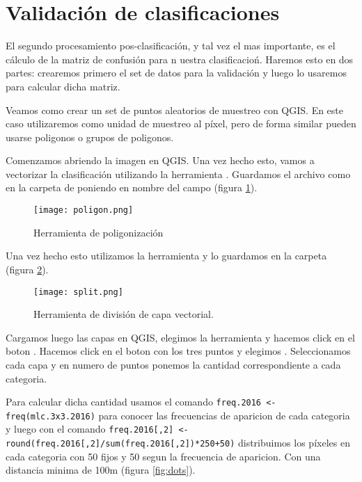 \section{Validaci\'on de clasificaciones}

El segundo procesamiento pos-clasificaci\'on, y tal vez el mas importante, es el c\'alculo de la matriz de confusi\'on para n
uestra clasificacio\'n. Haremos esto en dos partes: crearemos primero el set de datos para la validaci\'on y luego lo usaremos para calcular dicha matriz.

\begin{exa}
  Veamos como crear un set de puntos aleatorios de muestreo con QGIS. En este caso utilizaremos como unidad de muestreo al p\'ixel, pero de forma similar pueden usarse poligonos o grupos de poligonos.

  Comenzamos abriendo la imagen  en QGIS. Una vez hecho esto, vamos a vectorizar la clasificaci\'on utilizando la herramienta . Guardamos el archivo como  en la carpeta de  poniendo en nombre del campo  (figura \ref{fig:poligon}).

  \begin{figure}[h!]
    \centering
    \texttt{[image: poligon.png]}
    \caption{Herramienta de poligonizaci\'on}
    \label{fig:poligon}
  \end{figure}

  Una vez hecho esto utilizamos la herramienta  y lo guardamos en la carpeta  (figura \ref{fig:split}).

  \begin{figure}[h!]
    \centering
    \texttt{[image: split.png]}
    \caption{Herramienta de divisi\'on de capa vectorial.}
    \label{fig:split}
  \end{figure}

  Cargamos luego las capas en
  QGIS, elegimos la herramienta  y hacemos click en el boton . Hacemos click en el boton con los tres puntos y elegimos .  Seleccionamos cada capa y en numero de puntos ponemos la cantidad correspondiente a cada categoria.

  Para calcular dicha cantidad usamos el comando \texttt{freq.2016 <- freq(mlc.3x3.2016)}  para conocer las frecuencias de aparicion de cada categoria y luego con el comando  \texttt{freq.2016[,2] <- round(freq.2016[,2]/sum(freq.2016[,2])*250+50)} distribuimos  los p\'ixeles en cada categoria con 50 fijos y 50 segun la frecuencia de aparicion.
  Con una distancia minima de 100m (figura \ref{fig:dots}).


\end{exa}
